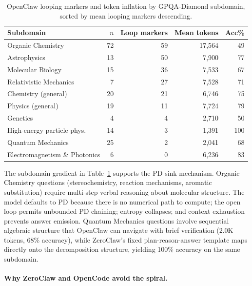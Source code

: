 \begin{table}[t]
\centering
\small
\caption{%
  OpenClaw looping markers and token inflation by GPQA-Diamond subdomain,
  sorted by mean looping markers descending.
}
\label{tab:gpqa-loop-subdomain}
\setlength{\tabcolsep}{4pt}
\begin{tabular}{lrrrr}
\toprule
Subdomain & $n$ & Loop markers & Mean tokens & Acc\% \\
\midrule
Organic Chemistry           & 72 &  59 & 17{,}564 &  49 \\
Astrophysics                & 13 &  50 &  7{,}900 &  77 \\
Molecular Biology           & 15 &  36 &  7{,}533 &  67 \\
Relativistic Mechanics      &  7 &  27 &  7{,}528 &  71 \\
Chemistry (general)         & 20 &  21 &  6{,}746 &  75 \\
Physics (general)           & 19 &  11 &  7{,}724 &  79 \\
Genetics                    &  4 &   4 &  2{,}710 &  50 \\
High-energy particle phys.  & 14 &   3 &  1{,}391 & 100 \\
Quantum Mechanics           & 25 &   2 &  2{,}041 &  68 \\
Electromagnetism \& Photonics & 6 &   0 &  6{,}236 &  83 \\
\bottomrule
\end{tabular}
\end{table}

The subdomain gradient in Table~\ref{tab:gpqa-loop-subdomain} supports the
PD-sink mechanism.
Organic Chemistry questions (stereochemistry, reaction mechanisms, aromatic
substitution) require multi-step verbal reasoning about molecular structure.
The model defaults to PD because there is no numerical path to compute; the
open loop permits unbounded PD chaining; entropy collapses; and context
exhaustion prevents answer emission.
Quantum Mechanics questions involve sequential algebraic structure that OpenClaw
can navigate with brief verification (2.0K tokens, 68\% accuracy), while
ZeroClaw's fixed plan-reason-answer template maps directly onto the
decomposition structure, yielding 100\% accuracy on the same subdomain.

\paragraph{Why ZeroClaw and OpenCode avoid the spiral.}

